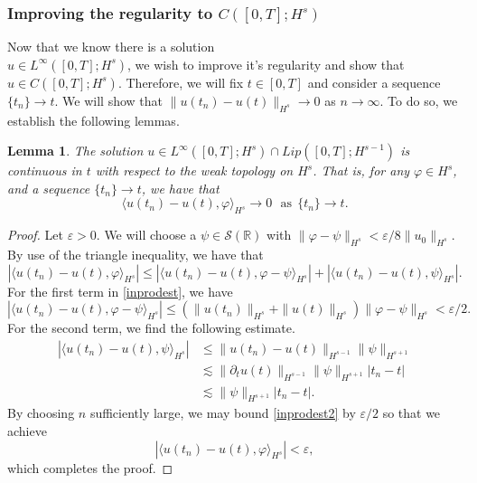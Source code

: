 \documentclass[reqno]{amsart}
\theoremstyle{plain}
\newtheorem{lemma}{Lemma}[section]
\numberwithin{equation}{section}
\newcommand{\p}{\partial}
\newcommand{\rr}{\mathbb{R}}
\newcommand{\ee}{\varepsilon}
\newcommand{\vp}{\varphi}
\begin{document}
\subsubsection{Improving the regularity to $C([0,T];H^s)$}  Now that we know there is a solution \\ $u \in L^\infty([0,T]; H^s)$, we wish to improve it's regularity and show that $u \in C([0,T];H^s)$.  Therefore, we will fix $t \in [0,T]$ and consider a sequence $\{t_n\} \to t$.  We will show that $\|u(t_n) - u(t)\|_{H^s} \to 0$ as $n \to \infty$.  To do so, we establish the following lemmas.
\begin{lemma}\label{inprod}
    The solution $u \in L^\infty([0,T]; H^s)\cap Lip([0,T];H^{s-1})$ is continuous in $t$ with respect to the weak topology on $H^s$.  That is, for any $\varphi \in H^s$, and a sequence $\{t_n\} \to t$, we have that $$\langle u(t_n)-u(t),\varphi\rangle_{H^s} \to 0 \ \ \ \text{as} \ \ \{t_n\} \to t.$$
\end{lemma}
\begin{proof}
    Let $\ee >0$.  We will choose a $\psi \in \mathcal{S}(\rr)$ with $\|\vp -\psi\|_{H^s} < \ee/8\|u_0\|_{H^s}$.  By use of the triangle inequality, we have that
    \begin{equation} \label{inprodest}
        |\langle u(t_n)-u(t),\varphi\rangle_{H^s}| \leq |\langle u(t_n)-u(t),\varphi -\psi\rangle_{H^s}|+|\langle u(t_n)-u(t),\psi\rangle_{H^s}|.
    \end{equation}
    For the first term in \eqref{inprodest}, we have 
    \begin{equation}\label{inprodest1}
        |\langle u(t_n)-u(t),\varphi -\psi\rangle_{H^s}| \leq (\|u(t_n)\|_{H^s}+\|u(t)\|_{H^s})\|\varphi-\psi\|_{H^s}<\ee/2.
    \end{equation}
    For the second term, we find the following estimate.
    \begin{align}\label{inprodest2}
        |\langle u(t_n)-u(t),\psi\rangle_{H^s}| &\leq \|u(t_n) - u(t)\|_{H^{s-1}}\|\psi\|_{H^{s+1}} \nonumber \\
        &\lesssim \|\p_tu(t)\|_{H^{s-1}}\|\psi\|_{H^{s+1}}|t_n - t| \nonumber \\
        &\lesssim\|\psi\|_{H^{s+1}}|t_n-t|.
    \end{align}
    By choosing $n$ sufficiently large, we may bound \eqref{inprodest2} by $\ee/2$ so that we achieve $$|\langle u(t_n)-u(t),\varphi\rangle_{H^s}|<\ee,$$
    which completes the proof.
\end{proof}
\end{document}
